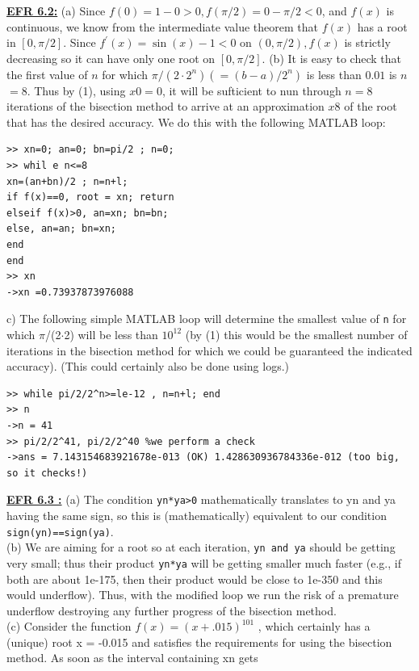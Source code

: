 \documentclass[../main.tex]{subfiles}
\begin{document}
\\
\\
\textbf{\underline{EFR 6.2:}} (a) Since $f(0)=1-0>0, f(\pi / 2)=0-\pi / 2<0$, and $f(x)$ is continuous, we know from the intermediate value theorem that $f(x)$ has a root in $[0, \pi / 2]$. Since $f^{\prime}(x)=\sin (x)-1<0$ on $(0, \pi / 2), f(x)$ is strictly decreasing so it can have only one root on $[0, \pi / 2]$.
(b) It is easy to check that the first value of $n$ for which $\pi /\left(2 \cdot 2^{n}\right)\left(=(b-a) / 2^{n}\right)$ is less than $0.01$ is $n$ $=8$. Thus by (1), using $x 0=0$, it will be sufticient to nun through $n=8$ iterations of the bisection method to arrive at an approximation $x 8$ of the root that has the desired accuracy. We do this with the following MATLAB loop:
\begin{lstlisting}[numbers=none,frame=none]
>> xn=0; an=0; bn=pi/2 ; n=0; 
>> whil e n<=8 
xn=(an+bn)/2 ; n=n+l; 
if f(x)==0, root = xn; return 
elseif f(x)>0, an=xn; bn=bn; 
else, an=an; bn=xn; 
end 
end 
>> xn 
->xn =0.73937873976088
\end{lstlisting}
c) The following simple MATLAB loop will determine the smallest value of \texttt{n} for which $\pi$/(2$\cdot$2) will be less than $10^{12}$
 (by (1) this would be the smallest number of iterations in the bisection method 
for which we could be guaranteed the indicated accuracy). (This could certainly also be done using logs.) 
\begin{lstlisting}[numbers=none,frame=none]
>> while pi/2/2^n>=le-12 , n=n+l; end 
>> n 
->n = 41 
>> pi/2/2^41, pi/2/2^40 %we perform a check 
->ans = 7.143154683921678e-013 (OK) 1.428630936784336e-012 (too big, so it checks!)
\end{lstlisting}
\textbf{\underline{EFR 6.3 :}} (a) The condition \texttt{yn*ya>0} mathematically translates to yn and ya having the same 
sign, so this is (mathematically) equivalent to our condition \texttt{sign(yn)==sign(ya)}.
\\ 
(b) We are aiming for a root so at each iteration, \texttt{yn and ya} should be getting very small; thus their 
product \texttt{yn*ya} will be getting smaller much faster (e.g., if both are about 1e-175, then their product 
would be close to 1e-350 and this would underflow). Thus, with the modified loop we run the risk of a 
premature underflow destroying any further progress of the bisection method. 
\\
(c) Consider the function $f(x)=(x +.015)^{101}$ , which certainly has a (unique) root x = -0.015 and 
satisfies the requirements for using the bisection method. As soon as the interval containing xn gets 
\end{document}
